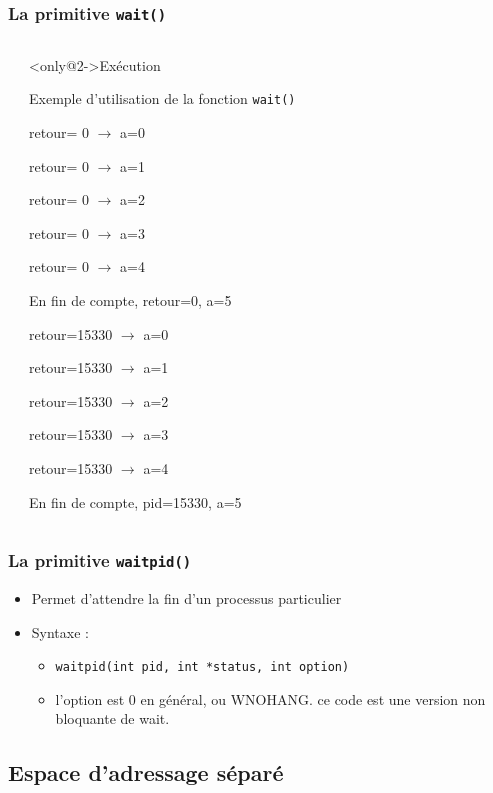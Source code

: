 \begin{frame}
\frametitle{La primitive \texttt{wait()}}
\begin{columns}
\begin{small}

\end{small}
\begin{block}<only@2->{Exécution}
\begin{tiny}
Exemple d'utilisation de la fonction \texttt{wait()}

retour=    0 $\rightarrow$ a=0

retour=    0 $\rightarrow$ a=1

retour=    0 $\rightarrow$ a=2

retour=    0 $\rightarrow$ a=3

retour=    0 $\rightarrow$ a=4

En fin de compte, retour=0, a=5

retour=15330 $\rightarrow$ a=0

retour=15330 $\rightarrow$ a=1

retour=15330 $\rightarrow$ a=2

retour=15330 $\rightarrow$ a=3

retour=15330 $\rightarrow$ a=4

En fin de compte, pid=15330, a=5
\end{tiny}
\end{block}
\end{columns}
\end{frame}

\begin{frame}
\frametitle{La primitive \texttt{waitpid()}}
\begin{itemize}
\item Permet d'attendre la fin d'un processus particulier
\item Syntaxe :
\begin{itemize}
\item \texttt{waitpid(int pid, int *status, int option)}
\item l'option est 0 en général, ou WNOHANG. ce code est une version non bloquante de wait. 
\end{itemize}
\end{itemize}
\end{frame}



\subsection{Espace d’adressage séparé}

